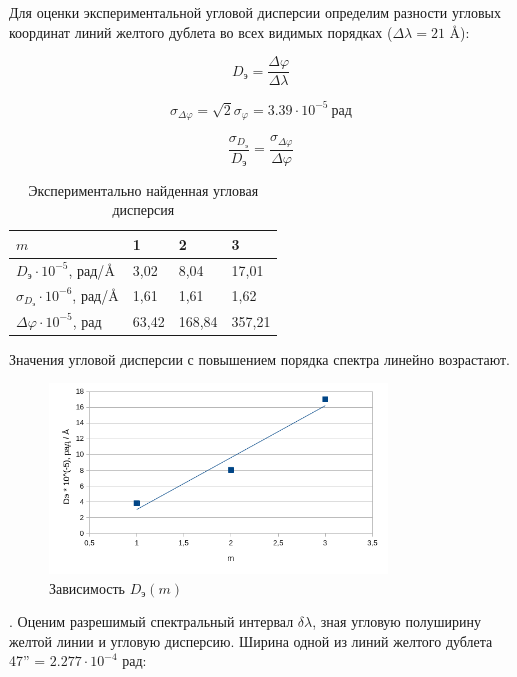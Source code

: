 \documentclass[a4paper, 12pt]{article}
\begin{document}
Для оценки экспериментальной угловой дисперсии определим разности угловых координат линий желтого дублета во всех видимых порядках ($\Delta \lambda = 21 \text{ \AA}$): 

\[D_\text{э} = \dfrac{\Delta \varphi}{\Delta \lambda}\]

\[\sigma_{\Delta \varphi} = \sqrt{2} \sigma_\varphi = 3.39 \cdot 10^{-5}~\text{рад}\]

\[\dfrac{\sigma_{D_\text{э}}}{D_\text{э}}=\dfrac{\sigma_{\Delta \varphi}}{\Delta \varphi}\]

\begin{table}[h!]
\centering
\label{Эксперимент дисперсия}
\begin{tabular}{|l|l|l|l|}
\hline
$m$                                & 1     & 2   & 3   \\ \hline
$D_\text{э} \cdot 10^{-5}$, рад/$\text{\AA}$ & 3,02  & 8,04  & 17,01 \\ \hline
$\sigma_{D_\text{э}} \cdot 10^{-6}$, рад/$\text{\AA}$ & 1,61 & 1,61 & 1,62\\ \hline
$\Delta \varphi \cdot 10^{-5}$, рад                        & 63,42 & 168,84 & 357,21\\ \hline
\end{tabular}
\caption{Экспериментально найденная угловая дисперсия}
\end{table}

Значения угловой дисперсии с повышением порядка спектра линейно возрастают.

\clearpage
\begin{figure}[h!]
\begin{center}
\includegraphics[width=0.8\textwidth]{graph2.png}
\end{center}
\caption{Зависимость $D_\text{э}(m)$} \label{D от фи}
\end{figure}

. Оценим разрешимый спектральный интервал $\delta \lambda$, зная угловую полуширину желтой линии и угловую дисперсию. Ширина одной из линий желтого дублета 47'' = $2.277 \cdot 10^{-4}$ рад:
\end{document}
